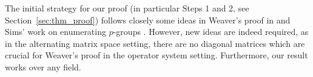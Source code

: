 The initial strategy for our proof (in particular Steps 1 and 2, see 
Section~\ref{sec:thm_proof}) follows closely some ideas in 
Weaver's proof in \cite{Wea17} and Sims' work on enumerating $p$-groups 
\cite[Sec. 2]{Sims65}. However, new ideas are indeed required, as in the 
alternating matrix space setting, there are no diagonal matrices which are crucial 
for Weaver's proof in the operator system setting. 
Furthermore, our result works 
over any field.
